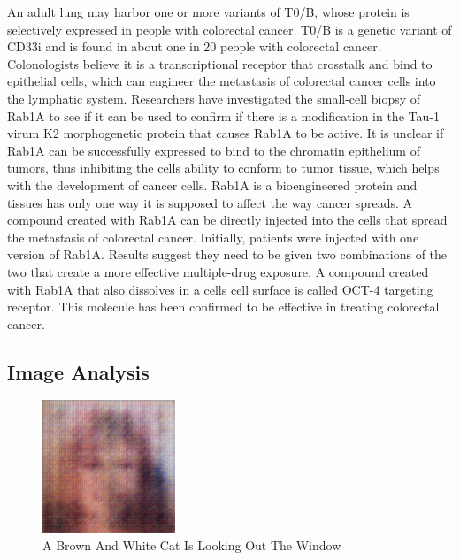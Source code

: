 \documentclass{article}%
\begin{document}
An adult lung may harbor one or more variants of T0/B, whose protein is selectively expressed in people with colorectal cancer. T0/B is a genetic variant of CD33i and is found in about one in 20 people with colorectal cancer.\newline%
Colonologists believe it is a transcriptional receptor that crosstalk and bind to epithelial cells, which can engineer the metastasis of colorectal cancer cells into the lymphatic system.\newline%
Researchers have investigated the small{-}cell biopsy of Rab1A to see if it can be used to confirm if there is a modification in the Tau{-}1 virum K2 morphogenetic protein that causes Rab1A to be active.\newline%
It is unclear if Rab1A can be successfully expressed to bind to the chromatin epithelium of tumors, thus inhibiting the cells ability to conform to tumor tissue, which helps with the development of cancer cells.\newline%
Rab1A is a bioengineered protein and tissues has only one way it is supposed to affect the way cancer spreads.\newline%
A compound created with Rab1A can be directly injected into the cells that spread the metastasis of colorectal cancer.\newline%
Initially, patients were injected with one version of Rab1A. Results suggest they need to be given two combinations of the two that create a more effective multiple{-}drug exposure.\newline%
A compound created with Rab1A that also dissolves in a cells cell surface is called OCT{-}4 targeting receptor. This molecule has been confirmed to be effective in treating colorectal cancer.

%
\subsection{Image Analysis}%
\label{subsec:ImageAnalysis}%


\begin{figure}[h!]%
\centering%
\includegraphics[width=150px]{500_fake_images/samples_5_478.png}%
\caption{A Brown And White Cat Is Looking Out The Window}%
\end{figure}

%
\end{document}
